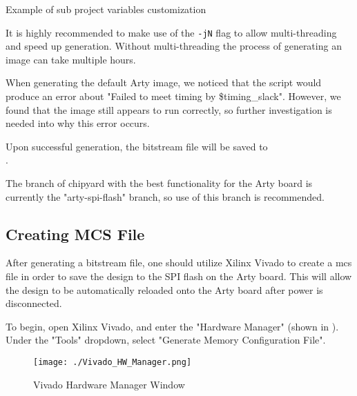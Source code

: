 \begin{listing}[h!tbp]
	\caption{Example of sub project variables customization}
	\label{lst:$makefile_subproject_example}
\end{listing}

It is highly recommended to make use of the \texttt{-jN} flag to allow multi-threading and speed up generation.
Without multi-threading the process of generating an image can take multiple hours.

When generating the default Arty image, we noticed that the script would produce an error about "Failed to meet timing by \$timing\_slack".
However, we found that the image still appears to run correctly, so further investigation is needed into why this error occurs.

Upon successful generation, the bitstream file will be saved to \\ .

The branch of chipyard with the best functionality for the Arty board is currently the "arty-spi-flash" branch, so use of this branch is recommended.

\subsection{Creating MCS File}\label{sec:Creating_MCS_file}
After generating a bitstream file, one should utilize Xilinx Vivado to create a \gls{mcs} file in order to save the design to the SPI flash on the Arty board.
This will allow the design to be automatically reloaded onto the Arty board after power is disconnected.

To begin, open Xilinx Vivado, and enter the "Hardware Manager" (shown in ).
Under the "Tools" dropdown, select "Generate Memory Configuration File".
\begin{figure}[h!tbp]
  \centering
  \texttt{[image: ./Vivado\_HW\_Manager.png]}
  \caption{Vivado Hardware Manager Window}
  \label{fig:Vivado_HW_Manager}
\end{figure}

